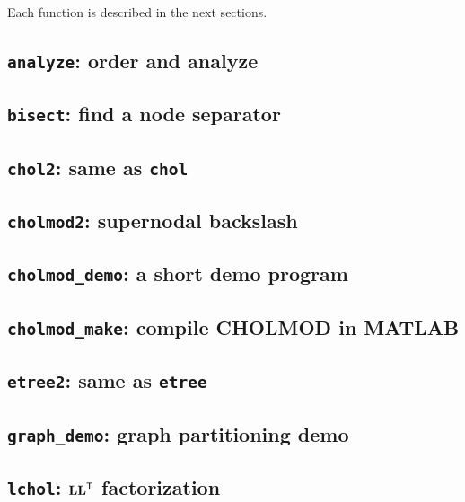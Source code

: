 \documentclass[11pt]{article}
\newcommand{\m}[1]{{\bf{#1}}}       %
\newcommand{\tr}{^{\sf T}}          %
\begin{document}
\vspace{0.1in}\noindent
Each function is described in the next sections.

\subsection{{\tt analyze}: order and analyze}


\subsection{{\tt bisect}: find a node separator}


\subsection{{\tt chol2}: same as {\tt chol}}


\subsection{{\tt cholmod2}: supernodal backslash}


\subsection{{\tt cholmod\_demo}: a short demo program}


\subsection{{\tt cholmod\_make}: compile CHOLMOD in MATLAB}


\subsection{{\tt etree2}: same as {\tt etree}}


\subsection{{\tt graph\_demo}: graph partitioning demo}


\subsection{{\tt lchol}: $\m{LL}\tr$ factorization}

\end{document}
